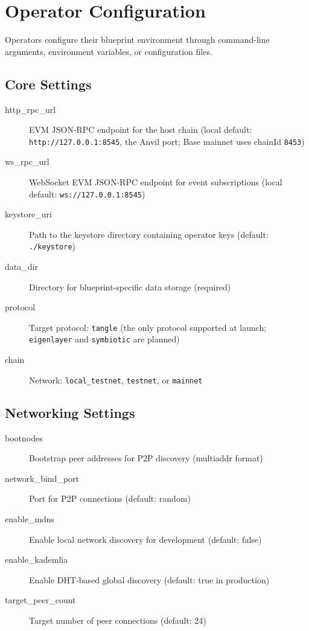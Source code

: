 \documentclass[11pt,a4paper]{article}
\begin{document}
\section{Operator Configuration}

Operators configure their blueprint environment through command-line arguments, environment variables, or configuration files.

\subsection{Core Settings}

\begin{description}
    \item[http\_rpc\_url] EVM JSON-RPC endpoint for the host chain (local default: \texttt{http://127.0.0.1:8545}, the Anvil port; Base mainnet uses chainId \texttt{8453})
    \item[ws\_rpc\_url] WebSocket EVM JSON-RPC endpoint for event subscriptions (local default: \texttt{ws://127.0.0.1:8545})
    \item[keystore\_uri] Path to the keystore directory containing operator keys (default: \texttt{./keystore})
    \item[data\_dir] Directory for blueprint-specific data storage (required)
    \item[protocol] Target protocol: \texttt{tangle} (the only protocol supported at launch; \texttt{eigenlayer} and \texttt{symbiotic} are planned)
    \item[chain] Network: \texttt{local\_testnet}, \texttt{testnet}, or \texttt{mainnet}
\end{description}

\subsection{Networking Settings}

\begin{description}
    \item[bootnodes] Bootstrap peer addresses for P2P discovery (multiaddr format)
    \item[network\_bind\_port] Port for P2P connections (default: random)
    \item[enable\_mdns] Enable local network discovery for development (default: false)
    \item[enable\_kademlia] Enable DHT-based global discovery (default: true in production)
    \item[target\_peer\_count] Target number of peer connections (default: 24)
\end{description}
\end{document}
